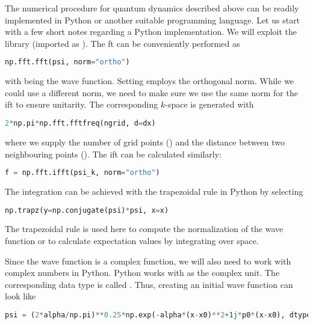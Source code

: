 The numerical procedure for quantum dynamics described above can be readily implemented in Python or another suitable programming language. Let us start with a few short notes regarding a Python implementation. We will exploit the  library (imported as ). The \acrlong{ft} can be conveniently performed as
\begin{lstlisting}[language=Python, style=mystyle2]
np.fft.fft(psi, norm="ortho")
\end{lstlisting}
with  being the wave function. Setting  employs the orthogonal norm. While we could use a different norm, we need to make sure we use the same norm for the \acrshort{ift} to ensure unitarity. The corresponding $k$-space is generated with
\begin{lstlisting}[language=Python, style=mystyle2]
2*np.pi*np.fft.fftfreq(ngrid, d=dx)
\end{lstlisting}
where we supply the number of grid points () and the distance between two neighbouring points (). The \acrlong{ift} can be calculated similarly: 
\begin{lstlisting}[language=Python, style=mystyle2]
f = np.fft.ifft(psi_k, norm="ortho")
\end{lstlisting}

The integration can be achieved with the trapezoidal rule in Python by selecting
\begin{lstlisting}[language=Python, style=mystyle2]
np.trapz(y=np.conjugate(psi)*psi, x=x)
\end{lstlisting}
The trapezoidal rule is used here to compute the normalization of the wave function or to calculate expectation values by integrating over space.

Since the wave function is a complex function, we will also need to work with complex numbers in Python. Python works with  as the complex unit. The corresponding data type is called . Thus, creating an initial wave function can look like 
\begin{lstlisting}[language=Python, style=mystyle2]
psi = (2*alpha/np.pi)**0.25*np.exp(-alpha*(x-x0)**2+1j*p0*(x-x0), dtype=complex)
\end{lstlisting}

